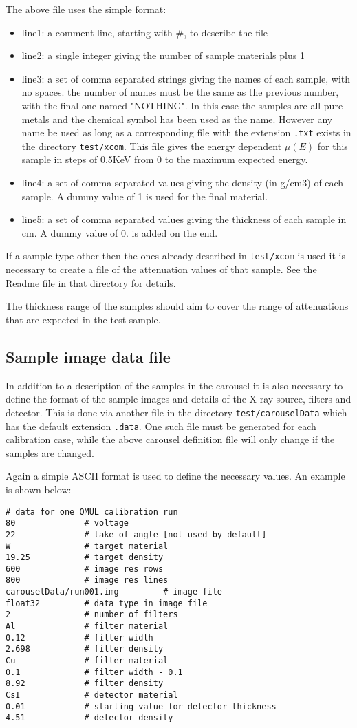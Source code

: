 \documentclass[a4paper,12pt]{article}
\begin{document}
The above file uses the simple format:
\begin{itemize}
\item{line1:} a comment line, starting with \#, to describe the file
\item{line2:} a single integer giving the number of sample materials plus 1
\item{line3:} a set of comma separated strings giving the names of each sample, with no spaces. the
number of names must be the same as the previous number, with the final one named "NOTHING".
In this case the samples are all pure metals and the chemical symbol has been used as the name.
However any name be used as long as a corresponding file with the extension \texttt{.txt} exists
in the directory \texttt{test/xcom}. This file gives the energy dependent $\mu(E)$ for this sample
in steps of 0.5KeV from 0 to the maximum expected energy.
\item{line4:} a set of comma separated values giving the density (in g/cm3) of each sample. A dummy
value of 1 is used for the final material.
\item{line5:} a set of comma separated values giving the thickness of each sample in cm. A dummy value of
0. is added on the end.
\end{itemize}
If a sample type other then the ones already described in \texttt{test/xcom} is used it is necessary to
create a file of the attenuation values of that sample.
See the Readme file in that directory for details.

The thickness range of the samples should aim to cover the range of attenuations that are expected in the test sample.

\subsection{Sample image data file}

In addition to a description of the samples in the carousel it is also necessary to define the format of the sample
images and details of the X-ray source, filters and detector.
This is done via another file in the directory \texttt{test/carouselData} which has the default extension \texttt{.data}.
One such file must be generated for each calibration case, while the above carousel definition file will only change
if the samples are changed.

Again a simple ASCII format is used to define the necessary values.
An example is shown below:
\begin{verbatim}
# data for one QMUL calibration run
80              # voltage
22              # take of angle [not used by default]
W               # target material
19.25           # target density
600             # image res rows
800             # image res lines
carouselData/run001.img         # image file
float32         # data type in image file
2               # number of filters
Al              # filter material
0.12            # filter width
2.698           # filter density
Cu              # filter material
0.1             # filter width - 0.1
8.92            # filter density
CsI             # detector material
0.01            # starting value for detector thickness
4.51            # detector density
\end{verbatim}
\end{document}

